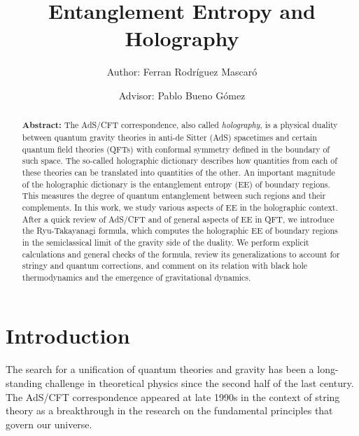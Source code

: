 \documentclass[twocolumn]{revtex4}
\begin{document}
\pagestyle{fancy}


\title{Entanglement Entropy and Holography}
\author{Author: Ferran Rodríguez Mascaró}
\author{Advisor: Pablo Bueno Gómez}


\begin{abstract}
    {\bf Abstract:} The AdS/CFT correspondence, also called \emph{holography}, is a physical duality between quantum gravity theories in anti-de Sitter (AdS) spacetimes and certain quantum field theories (QFTs) with conformal symmetry defined in the boundary of such space. The so-called holographic dictionary describes how quantities from each of these theories can be translated into quantities of the other. An important magnitude of the holographic dictionary is the entanglement entropy (EE) of boundary regions. This measures the degree of quantum entanglement between such regions and their complements. In this work, we study various aspects of EE in the holographic context. After a quick review of AdS/CFT and of general aspects of EE in QFT, we introduce the Ryu-Takayanagi formula, which computes the holographic EE of boundary regions in the semiclassical limit of the gravity side of the duality. We perform explicit calculations and general checks of the formula, review its generalizations to account for stringy and quantum corrections, and comment on its relation with black hole thermodynamics and the emergence of gravitational dynamics.
\end{abstract}


\maketitle


\section{Introduction} \label{s:Intro}

The search for a unification of quantum theories and gravity has been a long-standing challenge in theoretical physics since the second half of the last century. The AdS/CFT correspondence appeared at late 1990s in the context of string theory as a breakthrough in the research on the fundamental principles that govern our universe.
\end{document}
